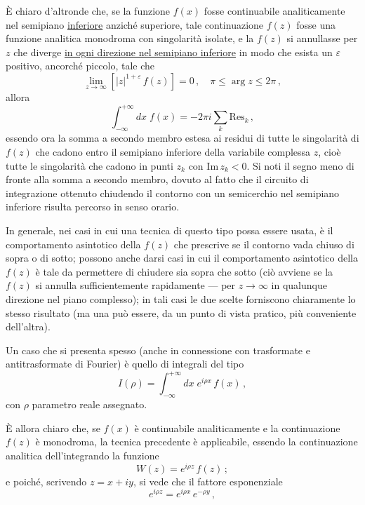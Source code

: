 \documentclass[11pt, a4paper]{book}
\numberwithin{equation}{section}
\begin{document}
È chiaro d'altronde che, se la funzione $f(x)$ fosse continuabile analiticamente nel semipiano \uline{inferiore} anziché superiore, tale continuazione $f(z)$ fosse una funzione analitica monodroma con singolarità isolate, e%
la $f(z)$ si annullasse per $z$ che diverge \uline{in ogni direzione nel semipiano inferiore} in modo che esista un $\varepsilon$ positivo, ancorché piccolo, tale che
\begin{equation}
\lim_{z \to \infty} \left[|z|^{1+\varepsilon}\,f(z)\right] = 0\,, \quad \pi \leq \arg z \leq 2\pi\,, \tag{13}
\end{equation}
allora
\begin{equation}
\int_{-\infty}^{+\infty} dx\; f(x) = -2\pi i \sum_k \mathrm{Res}_k\,, \tag{14}
\end{equation}
essendo ora la somma a secondo membro estesa ai residui di tutte le singolarità di $f(z)$ che cadono entro il semipiano inferiore della variabile complessa $z$, cioè tutte le singolarità che cadono in punti $z_k$ con $\mathrm{Im}\, z_k < 0$. Si noti il segno meno di fronte alla somma a secondo membro, dovuto al fatto che il circuito di integrazione ottenuto chiudendo il contorno con un semicerchio nel semipiano inferiore risulta percorso in senso orario.

In generale, nei casi in cui una tecnica di questo tipo possa essere usata, è il comportamento asintotico della $f(z)$ che prescrive se il contorno vada chiuso di sopra o di sotto; possono anche darsi casi in cui il comportamento asintotico della $f(z)$ è tale da permettere di chiudere sia sopra che sotto (ciò avviene se la $f(z)$ si annulla sufficientemente rapidamente — per $z \to \infty$ in qualunque direzione nel piano complesso); in tali casi le due scelte forniscono chiaramente lo stesso risultato (ma una può essere, da un punto di vista pratico, più conveniente dell'altra).

Un caso che si presenta spesso (anche in connessione con trasformate e antitrasformate di Fourier) è quello di integrali del tipo
\begin{equation}
I(\rho) = \int_{-\infty}^{+\infty} dx\; e^{i\rho x}\, f(x)\,, \tag{15}
\end{equation}
con $\rho$ parametro reale assegnato.

È allora chiaro che, se $f(x)$ è continuabile analiticamente e la continuazione $f(z)$ è monodroma, la tecnica precedente è applicabile, essendo la continuazione analitica dell'integrando la funzione
\begin{equation}
W(z) = e^{i\rho z}\, f(z)\,; \tag{16}
\end{equation}
e poiché, scrivendo $z = x + iy$, si vede che il fattore esponenziale
\begin{equation}
e^{i\rho z} = e^{i\rho x}\, e^{-\rho y}\,, \tag{17}
\end{equation}
\end{document}
